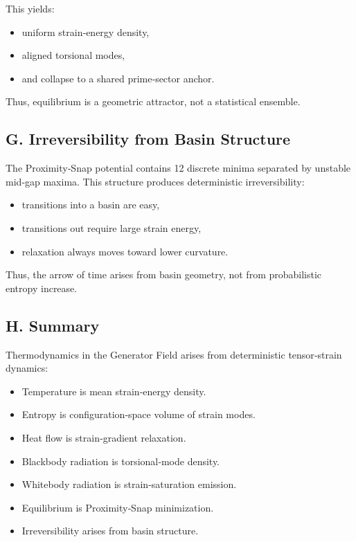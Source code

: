 \documentclass[reprint,amsmath,amssymb,aps,prl,floatfix]{revtex4-2}
\begin{document}
\begin{itemize}
This yields:
\begin{itemize}
\item uniform strain‑energy density,  
\item aligned torsional modes,  
\item and collapse to a shared prime‑sector anchor.
\end{itemize}

Thus, equilibrium is a geometric attractor, not a statistical ensemble.

\subsection{G. Irreversibility from Basin Structure}

The Proximity‑Snap potential contains 12 discrete minima separated by unstable mid‑gap maxima.  
This structure produces deterministic irreversibility:

\begin{itemize}
\item transitions into a basin are easy,  
\item transitions out require large strain energy,  
\item relaxation always moves toward lower curvature.
\end{itemize}

Thus, the arrow of time arises from basin geometry, not from probabilistic entropy increase.

\subsection{H. Summary}

Thermodynamics in the Generator Field arises from deterministic tensor‑strain dynamics:

\begin{itemize}
\item Temperature is mean strain‑energy density.  
\item Entropy is configuration‑space volume of strain modes.  
\item Heat flow is strain‑gradient relaxation.  
\item Blackbody radiation is torsional‑mode density.  
\item Whitebody radiation is strain‑saturation emission.  
\item Equilibrium is Proximity‑Snap minimization.  
\item Irreversibility arises from basin structure.
\end{itemize}


\end{itemize}
\end{document}
